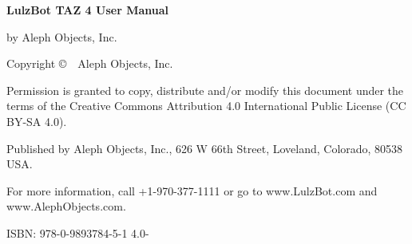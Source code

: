 %
%
%
%
%


\clearpage\null\vfill
\begingroup 
\thispagestyle{empty}
\footnotesize\raggedright
\setlength{\parskip}{0.5\baselineskip}

\textbf{LulzBot\textsuperscript{\miniscule{\texttrademark}} TAZ 4 User Manual}

by Aleph Objects, Inc.

Copyright \copyright\ \the\year\ Aleph Objects, Inc.\par
Permission is granted to copy, distribute and\slash or modify 
this document under the terms of the
Creative Commons Attribution 4.0 International Public License
(CC BY-SA 4.0).

Published by Aleph Objects, Inc., 626 W 66th Street, Loveland, Colorado, 80538 USA.

For more information, call +1-970-377-1111 or go to www.LulzBot.com and www.AlephObjects.com.

ISBN: 978-0-9893784-5-1
\hfill 4.0-{\the\year\the\month\the\day}
\endgroup
\pagebreak{}
